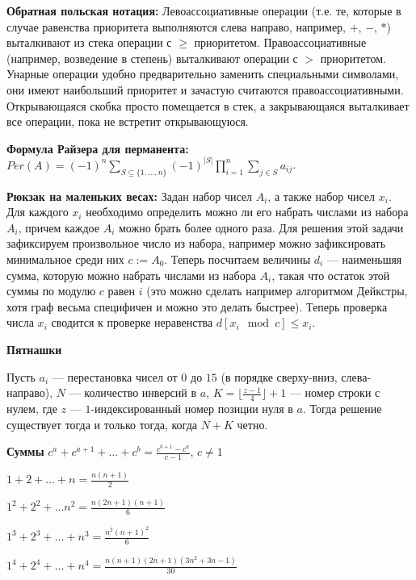 \textbf{Обратная польская нотация:}
Левоассоциативные операции (т.е. те, которые в случае равенства приоритета выполняются слева направо, например, $+$, $-$, $*$)
выталкивают из стека операции с $\geq$ приоритетом. Правоассоциативные (например, возведение в степень) выталкивают операции
с $>$ приоритетом. Унарные операции удобно предварительно заменить специальными символами, они имеют наибольший приоритет и
зачастую считаются правоассоциативными. Открывающаяся скобка просто помещается в стек, а закрывающаяся выталкивает все
операции, пока не встретит открывающуюся.

\textbf{Формула Райзера для перманента:}
$Per(A)=(-1)^n\sum\limits_{S\subseteq \{1, \ldots , n\}}(-1)^{|S|}\prod\limits_{i=1}^n\sum\limits_{j\in S}a_{ij}$.

\textbf{Рюкзак на маленьких весах:}
Задан набор чисел $A_i$, а также набор чисел $x_i$. Для каждого $x_i$ необходимо определить можно ли его набрать числами из набора $A_i$, причем каждое $A_i$ можно брать
более одного раза. Для решения этой задачи зафиксируем произвольное число из набора, например можно зафиксировать минимальное среди них  $c := A_0$. Теперь посчитаем величины
$d_i$ --- наименьшяя сумма, которую можно набрать числами из набора $A_i$, такая что остаток этой суммы по модулю $c$ равен $i$ (это можно сделать например алгоритмом
Дейкстры, хотя граф весьма специфичен и можно это делать быстрее). Теперь проверка числа $x_i$ сводится к проверке неравенства $d[x_i \mod c] \le x_i$.

\textbf{Пятнашки}

Пусть $a_i$ --- перестановка чисел от $0$ до $15$ (в порядке сверху-вниз, слева-направо),
$N$ --- количество инверсий в $a$, $K = \lfloor\frac{z - 1}4\rfloor + 1$ --- номер строки с нулем,
где $z$ --- $1$-индексированный номер позиции нуля в $a$. Тогда решение существует тогда и только
тогда, когда $N + K$ четно.

\textbf{Суммы}
$
c^a + c^{a + 1} + \ldots + c^{b} = \frac{c^{b + 1} - c^{a}}{c - 1}
$, $c \neq 1$

$1 + 2 + \ldots + n = \frac{n(n + 1)}{2}$

$1^2 + 2^2 + \ldots n^2 = \frac{n(2n + 1)(n + 1)}{6}$

$1^3 + 2^3 + \ldots + n^3 = \frac{n^2(n + 1)^2}{6}$

$1^4 + 2^4 + \ldots + n^4 = \frac{n(n + 1)(2n + 1)(3n^2 + 3n - 1)}{30}$